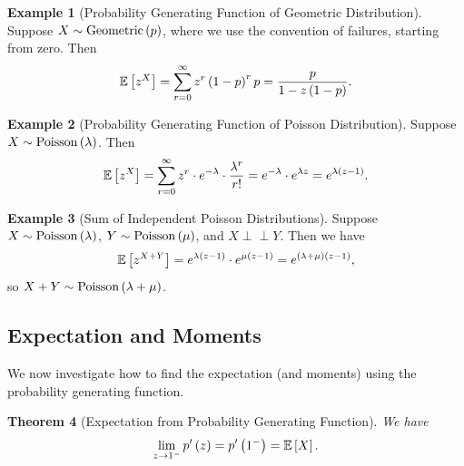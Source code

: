 \documentclass{article}
\newtheorem{theorem}{Theorem}[section]
\theoremstyle{definition}
\newtheorem{example}[theorem]{Example}
\theoremstyle{remark}
\newcommand{\Expt}{\mathbb{E}}
\newcommand{\indp}{\mathrel{\perp\!\!\!\perp}}
\newcommand{\Poisson}{\operatorname{Poisson}}
\newcommand{\Geometric}{\operatorname{Geometric}}
\begin{document}
\begin{example}[Probability Generating Function of Geometric Distribution]
    \label{ex:pgf-geometric}%
    Suppose \(X \sim \Geometric\pqty{p}\), where we use the convention of failures, starting from zero. Then
    \[
        \Expt\bqty{z^X} = \sum_{r = 0}^{\infty} z^r \pqty{1 - p}^r p = \frac{p}{1 - z\pqty{1 - p}}.
    \]
\end{example}

\begin{example}[Probability Generating Function of Poisson Distribution]
    \label{ex:pgf-poisson}%
    Suppose \(X \sim \Poisson\pqty{\lambda}\). Then
    \[
        \Expt\bqty{z^X} = \sum_{r = 0}^{\infty} z^r \cdot e^{-\lambda} \cdot \frac{\lambda^r}{r!} = e^{-\lambda} \cdot e^{\lambda z} = e^{\lambda \pqty{z - 1}}.
    \]
\end{example}

\begin{example}[Sum of Independent Poisson Distributions]
    Suppose \(X \sim \Poisson\pqty{\lambda}\), \(Y \sim \Poisson\pqty{\mu}\), and \(X \indp Y\). Then we have
    \[
        \Expt\bqty{z^{X + Y}} = e^{\lambda \pqty{z - 1}} \cdot e^{\mu\pqty{z - 1}} = e^{\pqty{\lambda + \mu} \pqty{z - 1}},
    \]
    so \(X + Y \sim \Poisson\pqty{\lambda + \mu}\).
\end{example}

\subsection{Expectation and Moments}

We now investigate how to find the expectation (and moments) using the probability generating function.

\begin{theorem}[Expectation from Probability Generating Function]
    \label{thm:expt-pgf}%
    We have
    \[
        \lim_{z \to 1^{-}} p'\pqty{z} = p'\pqty{1^{-}} = \Expt\bqty{X}.
    \]
\end{theorem}
\end{document}
